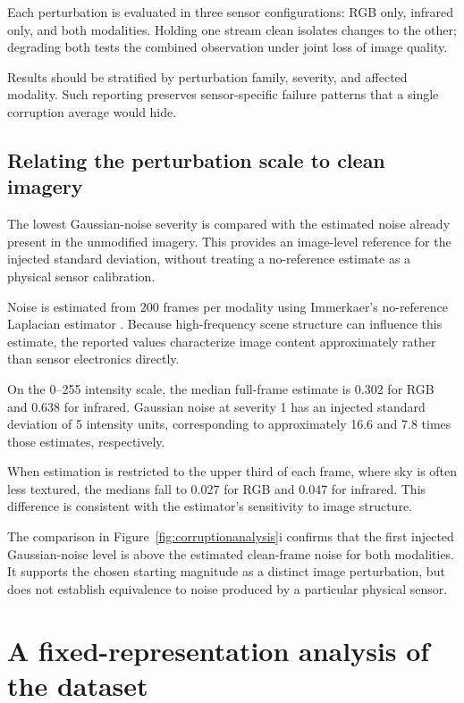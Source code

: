 \documentclass[10pt]{article}
\begin{document}
Each perturbation is evaluated in three sensor configurations: RGB only, infrared only, and both modalities. Holding one stream clean isolates changes to the other; degrading both tests the combined observation under joint loss of image quality.

Results should be stratified by perturbation family, severity, and affected modality. Such reporting preserves sensor-specific failure patterns that a single corruption average would hide.

\subsection{Relating the perturbation scale to clean imagery}

The lowest Gaussian-noise severity is compared with the estimated noise already present in the unmodified imagery. This provides an image-level reference for the injected standard deviation, without treating a no-reference estimate as a physical sensor calibration.

Noise is estimated from 200 frames per modality using Immerkaer's no-reference Laplacian estimator \citep{immerkaer1996}. Because high-frequency scene structure can influence this estimate, the reported values characterize image content approximately rather than sensor electronics directly.

On the 0--255 intensity scale, the median full-frame estimate is 0.302 for RGB and 0.638 for infrared. Gaussian noise at severity 1 has an injected standard deviation of 5 intensity units, corresponding to approximately 16.6 and 7.8 times those estimates, respectively.

When estimation is restricted to the upper third of each frame, where sky is often less textured, the medians fall to 0.027 for RGB and 0.047 for infrared. This difference is consistent with the estimator's sensitivity to image structure.

The comparison in Figure~\ref{fig:corruptionanalysis}i confirms that the first injected Gaussian-noise level is above the estimated clean-frame noise for both modalities. It supports the chosen starting magnitude as a distinct image perturbation, but does not establish equivalence to noise produced by a particular physical sensor.


\section{A fixed-representation analysis of the dataset}
\label{sec:intrinsic}
\end{document}
